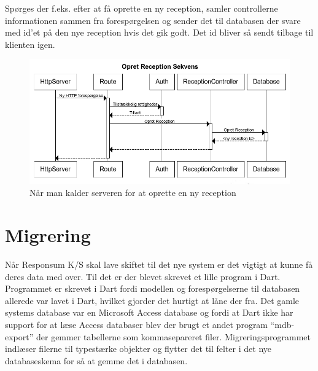 Spørges der f.eks. efter at få oprette en ny reception, samler controllerne informationen sammen fra forespørgelsen og sender det til databasen der svare med id'et på den nye reception hvis det gik godt. Det id bliver så sendt tilbage til klienten igen.

\begin{figure}[ht!]
\centering
\includegraphics[width=\textwidth]{images/serversequence.png}
\caption{Når man kalder serveren for at oprette en ny reception}
\label{fig:serversequence}
\end{figure}

\pagebreak
\section{Migrering}
Når Responsum K/S skal lave skiftet til det nye system er det vigtigt at kunne få deres data med over. Til det er der blevet skrevet et lille program i Dart. Programmet er skrevet i Dart fordi modellen og forespørgelserne til databasen allerede var lavet i Dart, hvilket gjorder det hurtigt at låne der fra. Det gamle systems database var en Microsoft Access database og fordi at Dart ikke har support for at læse Access databaser blev der brugt et andet program \enquote{mdb-export} der gemmer tabellerne som kommasepareret filer. Migreringsprogrammet indlæser filerne til typestærke objekter og flytter det til felter i det nye databaseskema for så at gemme det i databasen.